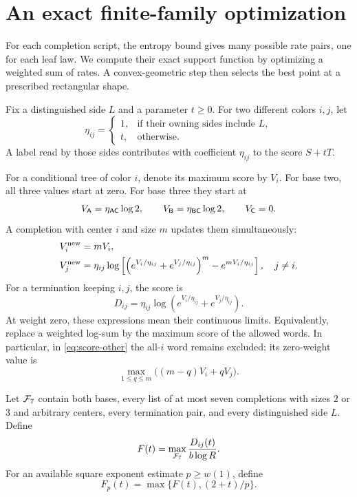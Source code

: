 \section{An exact finite-family optimization}\label{sec:optimization}

For each completion script, the entropy bound gives many possible
rate pairs, one for each leaf law.  We compute their exact support
function by optimizing a weighted sum of rates.  A convex-geometric
step then selects the best point at a prescribed rectangular shape.

Fix a distinguished side \(L\) and a parameter \(t\ge0\).
For two different colors \(i,j\), let
\[
 \eta_{ij}=
 \begin{cases}
  1,&\text{if their owning sides include }L,\\
  t,&\text{otherwise}.
 \end{cases}
\]
A label read by those sides contributes with coefficient \(\eta_{ij}\)
to the score \(S+tT\).

For a conditional tree of color \(i\), denote its maximum score by
\(V_i\).
For base two, all three values start at zero.
For base three they start at
\begin{equation}\label{eq:initial-scores}
 V_{\mathsf A}=\eta_{\mathsf A\mathsf C}\log2,\qquad
 V_{\mathsf B}=\eta_{\mathsf B\mathsf C}\log2,\qquad
 V_{\mathsf C}=0.
\end{equation}
A completion with center \(i\) and size \(m\) updates them simultaneously:
\begin{align}
 V_i^{\rm new}&=mV_i, \label{eq:score-center}\\
 V_j^{\rm new}
 &=\eta_{ij}\log\left[
   \left(e^{V_i/\eta_{ij}}+e^{V_j/\eta_{ij}}\right)^m
       -e^{mV_i/\eta_{ij}}\right],\quad j\ne i. \label{eq:score-other}
\end{align}
For a termination keeping \(i,j\), the score is
\begin{equation}\label{eq:termination-score}
 D_{ij}=\eta_{ij}\log
       \left(e^{V_i/\eta_{ij}}+e^{V_j/\eta_{ij}}\right).
\end{equation}
At weight zero, these expressions mean their continuous limits.
Equivalently, replace a weighted log-sum by the maximum score of the
allowed words.
In particular, in \eqref{eq:score-other} the all-\(i\) word remains
excluded; its zero-weight value is
\[
 \max_{1\le q\le m}\bigl((m-q)V_i+qV_j\bigr).
\]

\begin{definition}\label{def:support-function}
Let \(\mathcal F_7\) contain both bases, every list of at most seven
completions with sizes \(2\) or \(3\) and arbitrary centers, every
termination pair, and every distinguished side \(L\).
Define
\begin{equation}\label{eq:F-definition}
 F(t)=\max_{\mathcal F_7}\frac{D_{ij}(t)}{b\log R}.
\end{equation}
For an available square exponent estimate \(p\ge w(1)\), define
\[
 F_p(t)=\max\{F(t),(2+t)/p\}.
\]
\end{definition}

